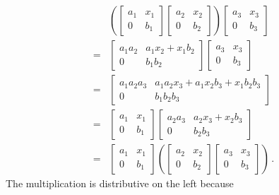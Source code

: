 \begin{align*}
  {}&
  \left(
    \begin{bmatrix}
      a_1 & x_1 \\
      0   & b_1
    \end{bmatrix}
    \begin{bmatrix}
      a_2 & x_2 \\
      0   & b_2
    \end{bmatrix}
  \right)
  \begin{bmatrix}
    a_3 & x_3 \\
    0   & b_3
  \end{bmatrix}
  \\
  ={}&
  \begin{bmatrix}
    a_1 a_2 & a_1 x_2 + x_1 b_2 \\
    0       & b_1 b_2
  \end{bmatrix}
  \begin{bmatrix}
    a_3 & x_3 \\
    0   & b_3
  \end{bmatrix}
  \\
  ={}&
  \begin{bmatrix}
    a_1 a_2 a_3 & a_1 a_2 x_3 + a_1 x_2 b_3 + x_1 b_2 b_3 \\
    0           & b_1 b_2 b_3
  \end{bmatrix}
  \\
  ={}&
  \begin{bmatrix}
      a_1 & x_1 \\
      0   & b_1
  \end{bmatrix}
  \begin{bmatrix}
    a_2 a_3 & a_2 x_3 + x_2 b_3 \\
    0       & b_2 b_3
  \end{bmatrix}
  \\
  ={}&
  \begin{bmatrix}
    a_1 & x_1 \\
    0   & b_1
  \end{bmatrix}
  \left(
    \begin{bmatrix}
      a_2 & x_2 \\
      0   & b_2
    \end{bmatrix}
    \begin{bmatrix}
      a_3 & x_3 \\
      0   & b_3
    \end{bmatrix}
  \right) \,.
\end{align*}
The multiplication is distributive on the left because
